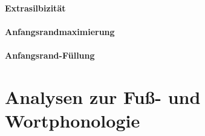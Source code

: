 \paragraph*{Extrasilbizität}

\paragraph*{Anfangsrandmaximierung}

\paragraph*{Anfangsrand-Füllung}



\section{Analysen zur Fuß- und Wortphonologie}
\label{sec:phonologie:analysenzurfussundwortphonologie}




